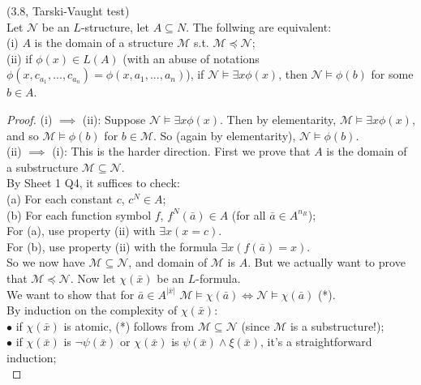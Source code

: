 \documentclass[a4paper]{article}
\begin{document}
\begin{lemma} (3.8, Tarski-Vaught test)\\
    Let $\mathcal{N}$ be an $L$-structure, let $A \subseteq N$. The follwing are equivalent:\\
    (i) $A$ is the domain of a structure $\mathcal{M}$ s.t. $\mathcal{M} \preccurlyeq \mathcal{N}$;\\
    (ii) if $\phi(x) \in L(A)$ (with an abuse of notations $\phi(x,c_{a_1},...,c_{a_n}) = \phi(x,a_1,...,a_n)$), if $\mathcal{N} \vDash \exists x \phi(x)$, then $\mathcal{N} \vDash \phi(b)$ for some $b \in A$.
    \begin{proof}
        (i) $\implies$ (ii): Suppose $\mathcal{N} \vDash \exists x \phi(x)$. Then by elementarity, $\mathcal{M} \vDash \exists x \phi(x)$, and so $\mathcal{M} \vDash \phi(b)$ for $b \in \mathcal{M}$. So (again by elementarity), $\mathcal{N} \vDash \phi(b)$.\\
        (ii) $\implies$ (i): This is the harder direction. First we prove that $A$ is the domain of a substructure $\mathcal{M} \subseteq \mathcal{N}$.\\
        By Sheet 1 Q4, it suffices to check:\\
        (a) For each constant $c$, $c^N \in A$;\\
        (b) For each function symbol $f$, $f^N(\bar{a}) \in A$ (for all $\bar{a} \in A^{n_R}$);\\
        For (a), use property (ii) with $\exists x (x=c)$.\\
        For (b), use property (ii) with the formula $\exists x (f(\bar{a}) = x)$.\\
        So we now have $\mathcal{M} \subseteq \mathcal{N}$, and domain of $\mathcal{M}$ is $A$. But we actually want to prove that $\mathcal{M} \preccurlyeq \mathcal{N}$. Now let $\chi(\bar{x})$ be an $L$-formula.\\
        We want to show that for $\bar{a} \in A^{|\bar{x}|}$ $\mathcal{M} \vDash \chi(\bar{a}) \iff \mathcal{N} \vDash \chi(\bar{a})$ (*).\\
        By induction on the complexity of $\chi(\bar{x})$:\\
        $\bullet$ if $\chi(\bar{x})$ is atomic, (*) follows from $\mathcal{M} \subseteq \mathcal{N}$ (since $\mathcal{M}$ is a substructure!);\\
        $\bullet$ if $\chi(\bar{x})$ is $\neg \psi(\bar{x})$ or $\chi(\bar{x})$ is $\psi(\bar{x})\wedge \xi(\bar{x})$, it's a straightforward induction;\\

\end{proof}
\end{lemma}
\end{document}
